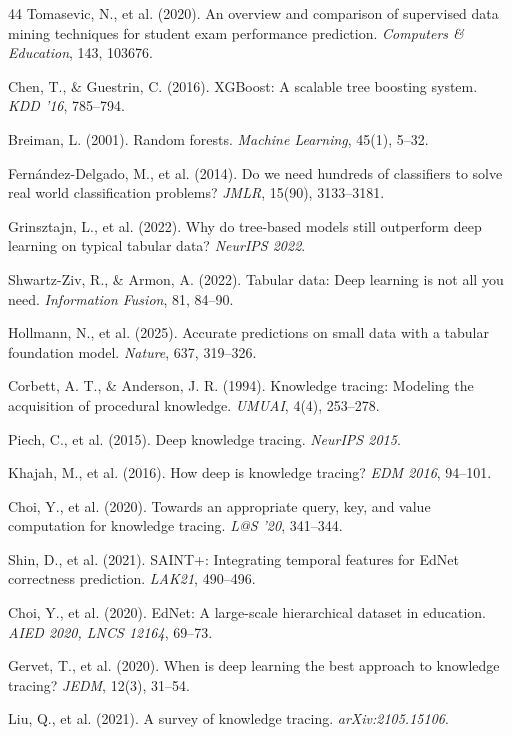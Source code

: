 \documentclass[11pt]{article}
\begin{document}
\begin{thebibliography}{44}
Tomasevic, N., et al. (2020). An overview and comparison of supervised data mining
techniques for student exam performance prediction. \textit{Computers \& Education}, 143,
103676.

Chen, T., \& Guestrin, C. (2016). XGBoost: A scalable tree boosting system.
\textit{KDD '16}, 785--794.

Breiman, L. (2001). Random forests. \textit{Machine Learning}, 45(1), 5--32.

Fern\'{a}ndez-Delgado, M., et al. (2014). Do we need hundreds of classifiers to solve
real world classification problems? \textit{JMLR}, 15(90), 3133--3181.

Grinsztajn, L., et al. (2022). Why do tree-based models still outperform deep learning on
typical tabular data? \textit{NeurIPS 2022}.

Shwartz-Ziv, R., \& Armon, A. (2022). Tabular data: Deep learning is not all you need.
\textit{Information Fusion}, 81, 84--90.

Hollmann, N., et al. (2025). Accurate predictions on small data with a tabular foundation
model. \textit{Nature}, 637, 319--326.

Corbett, A. T., \& Anderson, J. R. (1994). Knowledge tracing: Modeling the acquisition of
procedural knowledge. \textit{UMUAI}, 4(4), 253--278.

Piech, C., et al. (2015). Deep knowledge tracing. \textit{NeurIPS 2015}.

Khajah, M., et al. (2016). How deep is knowledge tracing? \textit{EDM 2016}, 94--101.

Choi, Y., et al. (2020). Towards an appropriate query, key, and value computation for
knowledge tracing. \textit{L@S '20}, 341--344.

Shin, D., et al. (2021). SAINT+: Integrating temporal features for EdNet correctness
prediction. \textit{LAK21}, 490--496.

Choi, Y., et al. (2020). EdNet: A large-scale hierarchical dataset in education.
\textit{AIED 2020, LNCS 12164}, 69--73.

Gervet, T., et al. (2020). When is deep learning the best approach to knowledge tracing?
\textit{JEDM}, 12(3), 31--54.

Liu, Q., et al. (2021). A survey of knowledge tracing. \textit{arXiv:2105.15106}.


\end{thebibliography}
\end{document}
